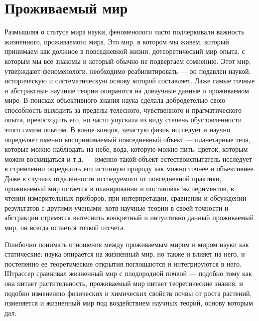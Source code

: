 \documentclass[11pt]{book}
\begin{document}
\section{Проживаемый мир}

Размышляя о статусе мира науки, феноменологи часто подчеркивали важность жизненного, проживаемого мира. Это мир, в котором мы живем, который принимаем как должное в повседневной жизни, дотеоретический мир опыта, с которым мы все знакомы и который обычно не подвергаем сомнению. Этот мир, утверждают феноменологи, необходимо реабилитировать --- он подавлен наукой, историческую и систематическую основу которой составляет. Даже самые точные и абстрактные научные теории опираются на донаучные данные о проживаемом мире. В поисках объективного знания наука сделала добродетелью свою способность выходить за пределы телесного, чувственного и прагматического опыта, превосходить его, но часто упускала из виду степень обусловленности этого самим опытом. В конце концов, зачастую физик исследует и научно определяет именно воспринимаемый повседневный объект --- планетарные тела, которые можно наблюдать на небе, вода, которую можно пить, цветок, которым можно восхищаться и т.д. --- именно такой объект естествоиспытатель исследует в стремлении определить его истинную природу как можно точнее и объективнее. Даже в случаях отдаленности исследуемого от повседневной практики, проживаемый мир остается в планировании и постановке экспериментов, в чтении измерительных приборов, при интерпретации, сравнении и обсуждении результатов с другими учеными: хотя научные теории в своей точности и абстракции стремятся вытеснить конкретный и интуитивно данный проживаемый мир, он всегда остается точкой отсчета.

Ошибочно понимать отношения между проживаемым миром и миром науки как статические: наука опирается на жизненный мир, но также и влияет на него, и постепенно ее теоретические открытия поглощаются и интегрируются в него. Штрассер сравнивал жизненный мир с плодородной почвой --- подобно тому как она питает растительность, проживаемый мир питает теоретические знания, и подобно изменению физических и химических свойств почвы от роста растений, изменяется и жизненный мир под воздействием научных теорий, основу которым дал.
\end{document}
